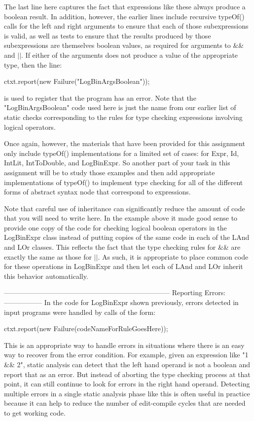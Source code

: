 \documentclass{article}
\begin{document}
The last line here captures the fact that expressions like these
always produce a boolean result.  In addition, however, the earlier
lines include recursive typeOf() calls for the left and right
arguments to ensure that each of those subexpressions is valid, as
well as tests to ensure that the results produced by those
subexpressions are themselves boolean values, as required for
arguments to \&\& and $|$$|$.  If either of the arguments does not produce a
value of the appropriate type, then the line:

   ctxt.report(new Failure("LogBinArgsBoolean"));

is used to register that the program has an error.  Note that the
"LogBinArgsBoolean" code used here is just the name from our earlier
list of static checks corresponding to the rules for type checking
expressions involving logical operators.

Once again, however, the materials that have been provided for this
assignment only include typeOf() implementations for a limited set of
cases: for Expr, Id, IntLit, IntToDouble, and LogBinExpr.  So another
part of your task in this assignment will be to study those examples
and then add appropriate implementations of typeOf() to implement type
checking for all of the different forms of abstract syntax node that
correspond to expressions.

Note that careful use of inheritance can significantly reduce the
amount of code that you will need to write here.  In the example above
it made good sense to provide one copy of the code for checking
logical boolean operators in the LogBinExpr class instead of putting
copies of the same code in each of the LAnd and LOr classes.  This
reflects the fact that the type checking rules for \&\& are exactly the
same as those for $|$$|$.  As such, it is appropriate to place common code
for these operations in LogBinExpr and then let each of LAnd and LOr
inherit this behavior automatically.

------------------------------------------------------------------------
Reporting Errors:
-----------------
In the code for LogBinExpr shown previously, errors detected in input
programs were handled by calls of the form:

   ctxt.report(new Failure(codeNameForRuleGoesHere));

This is an appropriate way to handle errors in situations where there
is an easy way to recover from the error condition.  For example,
given an expression like "1 \&\& 2",  static analysis can detect that
the left hand operand is not a boolean and report that as an error.
But instead of aborting the type checking process at that point, it
can still continue to look for errors in the right hand operand.
Detecting multiple errors in a single static analysis phase like this
is often useful in practice because it can help to reduce the number
of edit-compile cycles that are needed to get working code.
\end{document}
